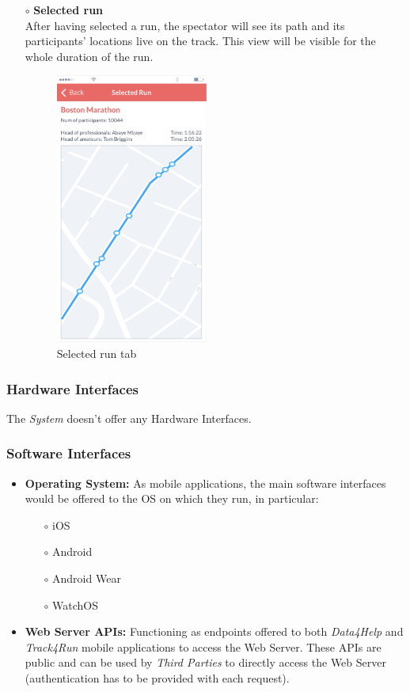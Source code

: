 \documentclass[titlepage]{article}
\begin{document}
\begin{itemize}
\begin{itemize}
\begin{itemize}
					\item[$\circ$] {\bf Selected run} \\
					After having selected a run, the spectator will see its path and its participants’ locations live on the track. This view will be visible for the whole duration of the run.\\	
					\begin{figure}[H]
						\center
  						\includegraphics[width=5cm]{Mockup/mockupSelectedRun.png}
  						\caption{Selected run tab}
 					 	\label{fig:SelectedRun}
					\end{figure}
				\end{itemize}
			\end{itemize}
		\end{itemize}
						
		\subsubsection{Hardware Interfaces}
		The {\it System} doesn’t offer any Hardware Interfaces.
			
		\subsubsection{Software Interfaces}
		\begin{itemize}
			\item{\bf Operating System: } As mobile applications, the main software interfaces would be offered to the OS on which they run, in particular:
			\begin{itemize}
				\item[$\circ$] iOS
				\item[$\circ$]Android
				\item[$\circ$] Android Wear
				\item[$\circ$] WatchOS
			\end{itemize}
			\item{\bf Web Server APIs: } Functioning as endpoints offered to both {\it Data4Help} and {\it Track4Run} mobile applications to access the Web Server.
These APIs are public and can be used by {\it Third Parties} to directly access the Web Server (authentication has to be provided with each request).

		\end{itemize}
			
\end{document}

